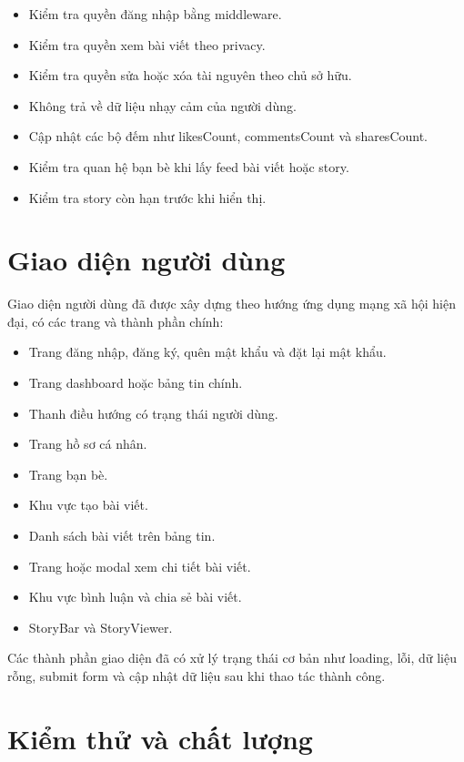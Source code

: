 \documentclass[12pt,a4paper]{article}
\begin{document}
\begin{itemize}
  \item Kiểm tra quyền đăng nhập bằng middleware.
  \item Kiểm tra quyền xem bài viết theo privacy.
  \item Kiểm tra quyền sửa hoặc xóa tài nguyên theo chủ sở hữu.
  \item Không trả về dữ liệu nhạy cảm của người dùng.
  \item Cập nhật các bộ đếm như likesCount, commentsCount và sharesCount.
  \item Kiểm tra quan hệ bạn bè khi lấy feed bài viết hoặc story.
  \item Kiểm tra story còn hạn trước khi hiển thị.
\end{itemize}

\section{Giao diện người dùng}

Giao diện người dùng đã được xây dựng theo hướng ứng dụng mạng xã hội hiện đại, có các trang và thành phần chính:

\begin{itemize}
  \item Trang đăng nhập, đăng ký, quên mật khẩu và đặt lại mật khẩu.
  \item Trang dashboard hoặc bảng tin chính.
  \item Thanh điều hướng có trạng thái người dùng.
  \item Trang hồ sơ cá nhân.
  \item Trang bạn bè.
  \item Khu vực tạo bài viết.
  \item Danh sách bài viết trên bảng tin.
  \item Trang hoặc modal xem chi tiết bài viết.
  \item Khu vực bình luận và chia sẻ bài viết.
  \item StoryBar và StoryViewer.
\end{itemize}

Các thành phần giao diện đã có xử lý trạng thái cơ bản như loading, lỗi, dữ liệu rỗng, submit form và cập nhật dữ liệu sau khi thao tác thành công.

\section{Kiểm thử và chất lượng}
\end{document}
